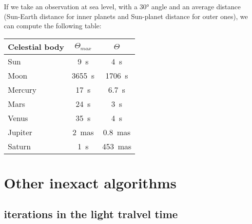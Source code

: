 \documentclass[%
a4paper,%
pagesize,%
12pt,%
parskip=off,%
bibliography=totoc,%
numbers=noenddot,%
DIV=12,%
twoside=semi,%
headings=small,%
]{scrartcl}
\begin{document}
If we take an observation at sea level, with a $30°$ angle and an average distance (Sun-Earth distance for inner planets and Sun-planet distance for outer ones), we can compute the following table:

\begin{center}
\begin{tabular}{|l|S|S[table-unit-alignment = left,table-format=4.1]|}
\hline
\textbf{Celestial body} & \textbf{$\Theta_{max}$} & \textbf{$\Theta$}  \\\hline
Sun & \SI{9}{\second} & \SI{4}{\second}\\\hline %
Moon & \SI{3655}{\second} & \SI{1706}{\second}\\\hline %
Mercury & \SI{17}{\second} & \SI{6.7}{\second}\\\hline %
Mars & \SI{24}{\second} & \SI{3}{\second}\\\hline %
Venus & \SI{35}{\second} & \SI{4}{\second}\\\hline %
Jupiter & \SI{2}{mas} & \SI{0.8}{mas} \\\hline %
Saturn & \SI{1}{\second} & \SI{453}{mas}\\\hline %
\end{tabular}
\end{center}

\section{Other inexact algorithms}

\subsection{iterations in the light tralvel time}
\end{document}
